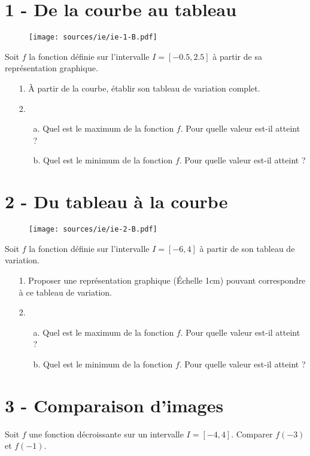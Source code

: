 \documentclass[10pt]{article}
\begin{document}
\begin{multicols}{2}
  \section*{1 - De la courbe au tableau}
  \begin{figure}[H]
    \centering
    \texttt{[image: sources/ie/ie-1-B.pdf]}
  \end{figure}

  Soit $f$ la fonction définie sur l'intervalle $I=[-0.5,2.5]$ à partir de sa représentation graphique.
  \begin{enumerate}
  \item[1.] À partir de la courbe, établir son tableau de variation complet.
  \item[2.]
    \begin{enumerate}
    \item[a.] Quel est le maximum de la fonction $f$. Pour quelle valeur est-il atteint ?
    \item[b.] Quel est le minimum de la fonction $f$. Pour quelle valeur est-il atteint ?
    \end{enumerate}
  \end{enumerate}

  \section*{2 - Du tableau à la courbe}

  \begin{figure}[H]
    \centering
    \texttt{[image: sources/ie/ie-2-B.pdf]}
  \end{figure}

  Soit $f$ la fonction définie sur l'intervalle $I=[-6,4]$ à partir de son tableau de variation.
  \begin{enumerate}
  \item[1.] Proposer une représentation graphique (Échelle 1cm) pouvant correspondre à ce tableau de variation.
  \item[2.]
    \begin{enumerate}
    \item[a.] Quel est le maximum de la fonction $f$. Pour quelle valeur est-il atteint ?
    \item[b.] Quel est le minimum de la fonction $f$. Pour quelle valeur est-il atteint ?
    \end{enumerate}
  \end{enumerate}

  \section*{3 - Comparaison d'images}

  Soit $f$ une fonction décroissante sur un intervalle $I=[-4,4]$. Comparer $f(-3)$ et $f(-1)$.
\end{multicols}
\end{document}
